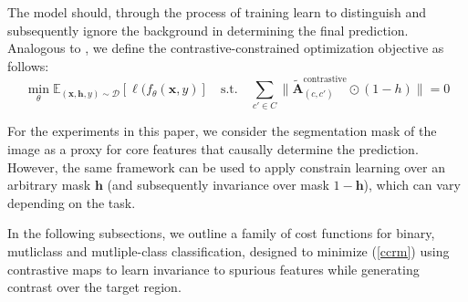 \documentclass{article}
\theoremstyle{plain}
\theoremstyle{definition}
\theoremstyle{remark}
\newcommand{\contcam}[2]{\tilde{\mathcal{\bm{A}}}^{\text{contrastive}}_{(#1, #2)}}
\begin{document}
The model should, through the process of training learn to distinguish and subsequently ignore the background in determining the final prediction. Analogous to \citep{singla2022core}, we define the contrastive-constrained optimization objective as follows:
\begin{equation}\label{ccrm}
	\min_\theta \mathbb{E}_{(\bm{x}, \bm{h}, y) \sim \mathcal{D}} \left[ \ell(f_\theta(\bm{x}, y) \right] \quad \text{s.t.} \quad \sum_{c' \in C} \| \contcam{c}{c'} \odot (1 - h) \| = 0
\end{equation}

For the experiments in this paper, we consider the segmentation mask of the image as a proxy for core features that causally determine the prediction. However, the same framework can be used to apply constrain learning over an arbitrary mask $\bm{h}$ (and subsequently invariance over mask $1 - \bm{h}$), which can vary depending on the task.


In the following subsections, we outline a family of cost functions for binary, mutliclass and mutliple-class classification, designed to minimize (\ref{ccrm}) using contrastive maps to learn invariance to spurious features while generating contrast over the target region.
\end{document}
